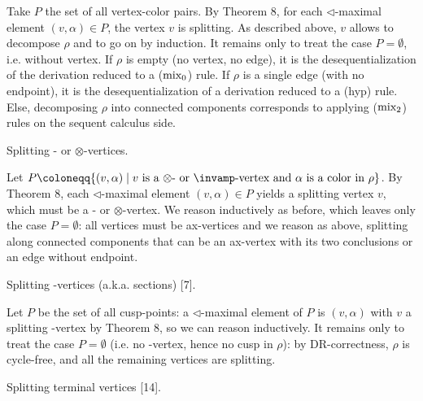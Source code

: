 Take $P$ the set of all vertex-color pairs. By Theorem 8, for each $\lhd$-maximal element $(v,\alpha)\in P$, the vertex $v$ is splitting. As described above, $v$ allows to decompose $\rho$ and to go on by induction. It remains only to treat the case $P=\emptyset$, i.e. without vertex. If $\rho$ is empty (no vertex, no edge), it is the desequentialization of the derivation reduced to a ($\textnormal{{mix}}_{0}$) rule. If $\rho$ is a single edge (with no endpoint), it is the desequentialization of a derivation reduced to a (hyp) rule. Else, decomposing $\rho$ into connected components corresponds to applying ($\textnormal{{mix}}_{2}$) rules on the sequent calculus side.\par
 
  Splitting - or $\otimes$-vertices.  
 
Let $P\coloneqq\{(v,\alpha)\mid\text{$v$ is a $\otimes$- or $\invamp$-vertex and $%
\alpha$ is a color in $\rho$}\}$. By Theorem 8, each $\lhd$-maximal element $(v,\alpha)\in P$ yields a splitting vertex $v$, which must be a - or $\otimes$-vertex. We reason inductively as before, which leaves only the case $P=\emptyset$: all vertices must be ax-vertices and we reason as above, splitting along connected components that can be an ax-vertex with its two conclusions or an edge without endpoint.\par
 
  Splitting -vertices (a.k.a. sections) [7].  
 
Let $P$ be the set of all cusp-points: a $\lhd$-maximal element of $P$ is $(v,\alpha)$ with $v$ a splitting -vertex by Theorem 8, so we can reason inductively. It remains only to treat the case $P=\emptyset$ (i.e. no -vertex, hence no cusp in $\rho$): by DR-correctness, $\rho$ is cycle-free, and all the remaining vertices are splitting.\par
 
  Splitting terminal vertices [14].  
 
